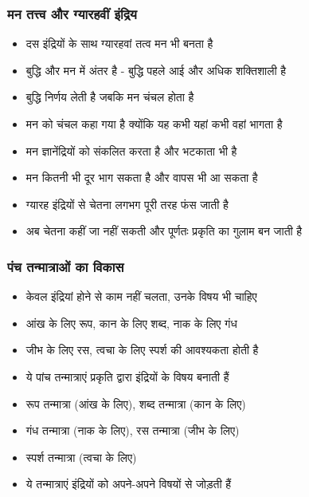 \begin{frame}[fragile]\frametitle{मन तत्त्व और ग्यारहवीं इंद्रिय}
      \begin{itemize}
          \item दस इंद्रियों के साथ ग्यारहवां तत्व मन भी बनता है
          \item बुद्धि और मन में अंतर है - बुद्धि पहले आई और अधिक शक्तिशाली है
          \item बुद्धि निर्णय लेती है जबकि मन चंचल होता है
          \item मन को चंचल कहा गया है क्योंकि यह कभी यहां कभी वहां भागता है
          \item मन ज्ञानेंद्रियों को संकलित करता है और भटकाता भी है
          \item मन कितनी भी दूर भाग सकता है और वापस भी आ सकता है
          \item ग्यारह इंद्रियों से चेतना लगभग पूरी तरह फंस जाती है
          \item अब चेतना कहीं जा नहीं सकती और पूर्णतः प्रकृति का गुलाम बन जाती है
      \end{itemize}
\end{frame}

\begin{frame}[fragile]\frametitle{पंच तन्मात्राओं का विकास}
      \begin{itemize}
          \item केवल इंद्रियां होने से काम नहीं चलता, उनके विषय भी चाहिए
          \item आंख के लिए रूप, कान के लिए शब्द, नाक के लिए गंध
          \item जीभ के लिए रस, त्वचा के लिए स्पर्श की आवश्यकता होती है
          \item ये पांच तन्मात्राएं प्रकृति द्वारा इंद्रियों के विषय बनाती हैं
          \item रूप तन्मात्रा (आंख के लिए), शब्द तन्मात्रा (कान के लिए)
          \item गंध तन्मात्रा (नाक के लिए), रस तन्मात्रा (जीभ के लिए)
          \item स्पर्श तन्मात्रा (त्वचा के लिए)
          \item ये तन्मात्राएं इंद्रियों को अपने-अपने विषयों से जोड़ती हैं
      \end{itemize}
\end{frame}

